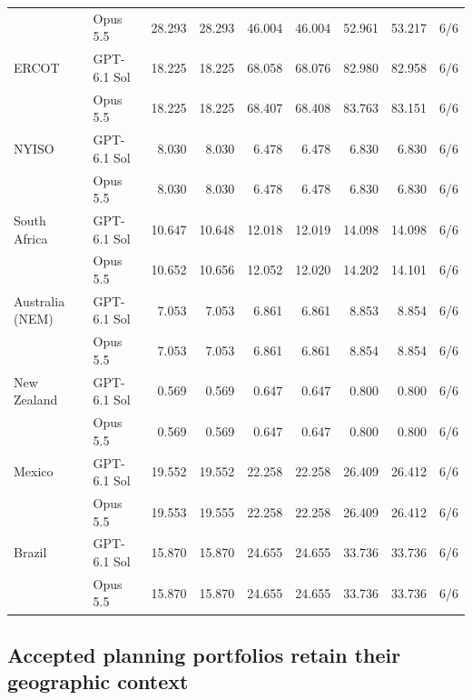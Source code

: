 \documentclass[pdflatex,sn-nature]{sn-jnl}
\begin{document}
\begin{appendices}
\begin{tableorg}[p]
{\begin{tabular*}{170mm}{@{\extracolsep{\fill}}llrrrrrrr@{}}
 & Opus 5.5 & 28.293 & 28.293 & 46.004 & 46.004 & 52.961 & 53.217 & 6/6 \\
\addlinespace[3pt]
ERCOT & GPT-6.1 Sol & 18.225 & 18.225 & 68.058 & 68.076 & 82.980 & 82.958 & 6/6 \\
 & Opus 5.5 & 18.225 & 18.225 & 68.407 & 68.408 & 83.763 & 83.151 & 6/6 \\
\addlinespace[3pt]
NYISO & GPT-6.1 Sol & 8.030 & 8.030 & 6.478 & 6.478 & 6.830 & 6.830 & 6/6 \\
 & Opus 5.5 & 8.030 & 8.030 & 6.478 & 6.478 & 6.830 & 6.830 & 6/6 \\
\addlinespace[3pt]
South Africa & GPT-6.1 Sol & 10.647 & 10.648 & 12.018 & 12.019 & 14.098 & 14.098 & 6/6 \\
 & Opus 5.5 & 10.652 & 10.656 & 12.052 & 12.020 & 14.202 & 14.101 & 6/6 \\
\addlinespace[3pt]
Australia (NEM) & GPT-6.1 Sol & 7.053 & 7.053 & 6.861 & 6.861 & 8.853 & 8.854 & 6/6 \\
 & Opus 5.5 & 7.053 & 7.053 & 6.861 & 6.861 & 8.854 & 8.854 & 6/6 \\
\addlinespace[3pt]
New Zealand & GPT-6.1 Sol & 0.569 & 0.569 & 0.647 & 0.647 & 0.800 & 0.800 & 6/6 \\
 & Opus 5.5 & 0.569 & 0.569 & 0.647 & 0.647 & 0.800 & 0.800 & 6/6 \\
\addlinespace[3pt]
Mexico & GPT-6.1 Sol & 19.552 & 19.552 & 22.258 & 22.258 & 26.409 & 26.412 & 6/6 \\
 & Opus 5.5 & 19.553 & 19.555 & 22.258 & 22.258 & 26.409 & 26.412 & 6/6 \\
\addlinespace[3pt]
Brazil & GPT-6.1 Sol & 15.870 & 15.870 & 24.655 & 24.655 & 33.736 & 33.736 & 6/6 \\
 & Opus 5.5 & 15.870 & 15.870 & 24.655 & 24.655 & 33.736 & 33.736 & 6/6 \\
\bottomrule
\end{tabular*}}
\end{tableorg}

\clearpage
\subsection{Accepted planning portfolios retain their geographic context}\label{sec:geographic-results}


\end{appendices}
\end{document}
